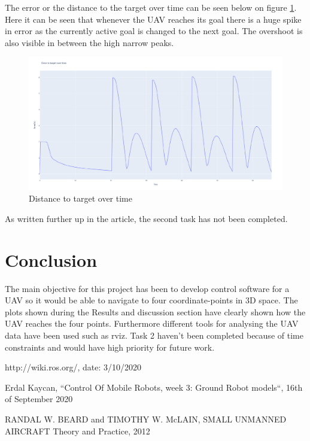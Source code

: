 \documentclass[conference]{IEEEtran}
\begin{document}
The error or the distance to the target over time can be seen below on figure \ref{fig:error_to_target}. Here it can be seen that whenever the UAV reaches its goal there is a huge spike in error as the currently active goal is changed to the next goal. The overshoot is also visible in between the high narrow peaks. 


\begin{figure}[hbtp]
	\centering
	\includegraphics[width=1.0\linewidth]{images/error_to_target.pdf}
	\caption{Distance to target over time}
	\label{fig:error_to_target}
\end{figure}

As written further up in the article, the second task has not been completed. 


\section{Conclusion}
The main objective for this project has been to develop control software for a UAV so it would be able to navigate to four coordinate-points in 3D space. The plots shown during the Results and discussion section have clearly shown how the UAV reaches the four points. Furthermore different tools for analysing the UAV data have been used such as rviz. Task 2 haven't been completed because of time constraints and would have high priority for future work.

\begin{thebibliography}{00}

 http://wiki.ros.org/, date: 3/10/2020

 Erdal Kaycan, ``Control Of Mobile Robots, week 3: Ground Robot models``, 16th of September 2020

 RANDAL W. BEARD and TIMOTHY W. McLAIN, SMALL UNMANNED AIRCRAFT Theory and Practice, 2012

\end{thebibliography}
\vspace{12pt}
\end{document}

